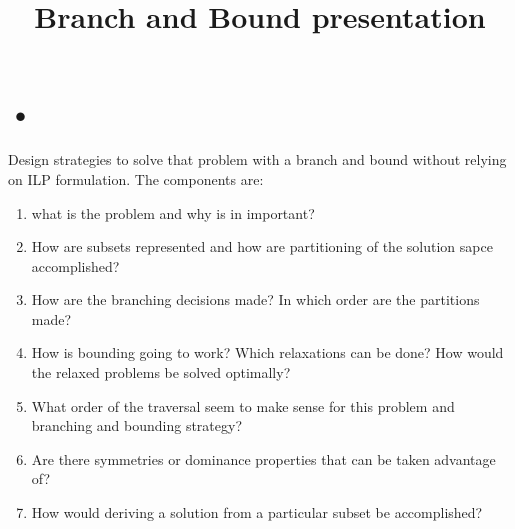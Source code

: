 \documentclass[11pt, conference, onecolumn]{IEEEtran}
\begin{document}
\title{Branch and Bound presentation }

\maketitle
\section*{•}
Design strategies to  solve that problem with a branch and bound without relying on ILP formulation. The components are:
\begin{enumerate}

\item what is the problem and why is in important?

\item How are subsets represented and how are partitioning of the solution sapce accomplished?

\item How are the branching decisions made? In which order are the partitions made?

\item How is bounding going to work? Which relaxations can be done? How would the relaxed problems be solved optimally?

\item What order of the traversal seem to make sense for this problem and branching and bounding strategy?

\item Are there symmetries or dominance properties that can be taken advantage of?

\item How would deriving a solution from a particular subset be accomplished?

\end{enumerate}
\end{document}
